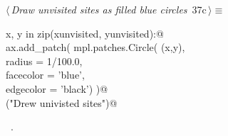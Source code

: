 \documentclass[11.5pt]{report}
\begin{document}
\begin{flushleft} \small\label{scrap36}\raggedright\small
{} $\langle\,${\itshape Draw unvisited sites as filled blue circles}\nobreak\ {\footnotesize {37c}}$\,\rangle\equiv$
\vspace{-1ex}
\begin{list}{}{} \item
\mbox{}\verb@for x, y in zip(xunvisited, yunvisited):@\\
\mbox{}\verb@     ax.add_patch( mpl.patches.Circle( (x,y),\@\\
\mbox{}\verb@                                    radius    = 1/100.0,\@\\
\mbox{}\verb@                                    facecolor = 'blue',\@\\
\mbox{}\verb@                                    edgecolor = 'black')  )@\\
\mbox{}\verb@debug("Drew univisted sites")@\\
\mbox{}\verb@@{\NWsep}
\end{list}
\vspace{-1.5ex}
\footnotesize
\begin{list}{}{\setlength{\itemsep}{-\parsep}\setlength{\itemindent}{-\leftmargin}}
\item \NWtxtMacroRefIn\ .

\item{}
\end{list}
\vspace{4ex}
\end{flushleft}
\vspace{-0.8cm}\newchunk 
\end{document}
